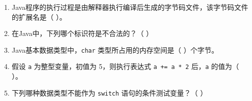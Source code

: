 \documentclass[a3paper, landscape, 11pt, twocolumn]{article}
\begin{document}
\begin{enumerate}[label=\arabic*., itemsep=1em]
	\item Java程序的执行过程是由解释器执行编译后生成的字节码文件，该字节码文件的扩展名是（ \quad ）。

	\item 在Java中，下列哪个标识符是不合法的？（ \quad ）

	\item Java基本数据类型中，\texttt{char} 类型所占用的内存空间是（ \quad ）个字节。

	\item 假设 \texttt{a} 为整型变量，初值为 5，则执行表达式 \texttt{a += a * 2} 后，\texttt{a} 的值为（ \quad ）。

	\item 下列哪种数据类型不能作为 \texttt{switch} 语句的条件测试变量？（ \quad ）


\end{enumerate}
\end{document}
